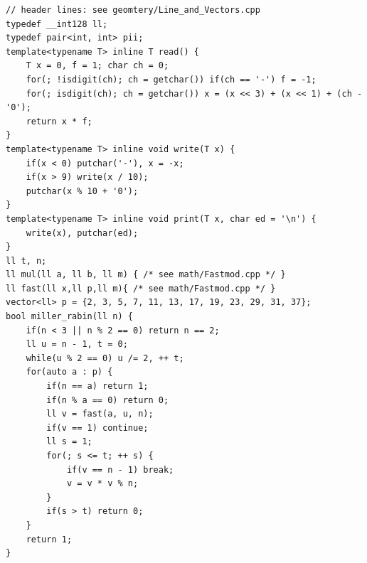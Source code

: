 \begin{lstlisting}[breaklines=true]
// header lines: see geomtery/Line_and_Vectors.cpp
typedef __int128 ll;
typedef pair<int, int> pii;
template<typename T> inline T read() {
    T x = 0, f = 1; char ch = 0;
    for(; !isdigit(ch); ch = getchar()) if(ch == '-') f = -1;
    for(; isdigit(ch); ch = getchar()) x = (x << 3) + (x << 1) + (ch - '0');
    return x * f;
}
template<typename T> inline void write(T x) {
    if(x < 0) putchar('-'), x = -x;
    if(x > 9) write(x / 10);
    putchar(x % 10 + '0');
}
template<typename T> inline void print(T x, char ed = '\n') {
    write(x), putchar(ed);
}
ll t, n;
ll mul(ll a, ll b, ll m) { /* see math/Fastmod.cpp */ }
ll fast(ll x,ll p,ll m){ /* see math/Fastmod.cpp */ }
vector<ll> p = {2, 3, 5, 7, 11, 13, 17, 19, 23, 29, 31, 37};
bool miller_rabin(ll n) {
    if(n < 3 || n % 2 == 0) return n == 2;
    ll u = n - 1, t = 0;
    while(u % 2 == 0) u /= 2, ++ t;
    for(auto a : p) {
        if(n == a) return 1;
        if(n % a == 0) return 0;
        ll v = fast(a, u, n);
        if(v == 1) continue;
        ll s = 1;
        for(; s <= t; ++ s) {
            if(v == n - 1) break;
            v = v * v % n;
        }
        if(s > t) return 0; 
    }
    return 1;
}
\end{lstlisting}


